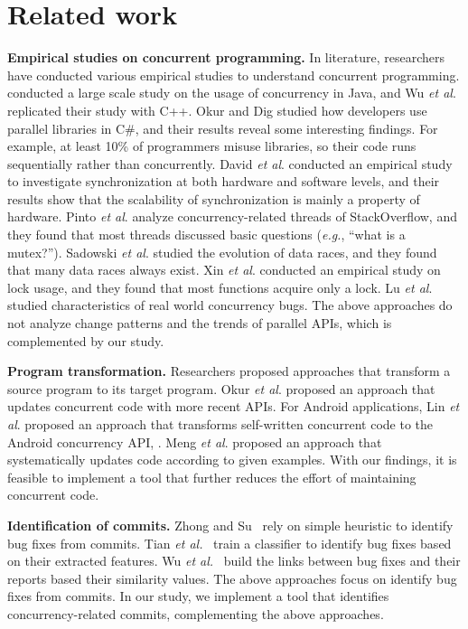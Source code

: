 \section{Related work}
\noindent
\textbf{Empirical studies on concurrent programming.} In literature, researchers have conducted various empirical studies to understand concurrent programming. \cite{journals/jss/PintoTFFB15} conducted a large scale study on the usage of concurrency in Java, and Wu \textit{et al}. \cite{journals/infsof/WuCZX16} replicated their study with C++. Okur and Dig \cite{conf/sigsoft/OkurD12} studied how developers use parallel libraries in C\#, and their results reveal some interesting findings. For example, at least 10\% of programmers misuse libraries, so their code runs sequentially rather than concurrently. David \textit{et al}. \cite{conf/sosp/DavidGT13} conducted an empirical study to investigate synchronization at both hardware and software levels, and their results show that the scalability of synchronization is mainly a property of hardware. Pinto \textit{et al}. \cite{conf/oopsla/PintoTC15} analyze concurrency-related threads of StackOverflow, and they found that most threads discussed basic questions (\emph{e.g.}, ``what is a mutex?''). Sadowski \textit{et al}. \cite{conf/msr/SadowskiYK12} studied the evolution of data races, and they found that many data races always exist. Xin \textit{et al}. \cite{conf/icsm/XinQHXZWG13} conducted an empirical study on lock usage, and they found that most functions acquire only a lock. Lu \textit{et al}. \cite{conf/asplos/LuPSZ08} studied characteristics of real world concurrency bugs. The above approaches do not analyze change patterns and the trends of parallel APIs, which is complemented by our study.

\noindent
\textbf{Program transformation.} Researchers proposed approaches that transform a source program to its target program. Okur \textit{et al}. \cite{conf/ecoop/OkurED14} proposed an approach that updates concurrent code with more recent APIs. For Android applications, Lin \textit{et al}. \cite{conf/sigsoft/LinRD14} proposed an approach that transforms self-written concurrent code to the Android concurrency API, . Meng \textit{et al}. \cite{conf/pldi/MengKM11} proposed an approach that systematically updates code according to given examples. With our findings, it is feasible to implement a tool that further reduces the effort of maintaining concurrent code.

\noindent
\textbf{Identification of commits.} Zhong and Su~\cite{zhong2015bugfix} rely on simple heuristic to identify bug fixes from commits. Tian \emph{et al.}~\cite{tian2012identifying} train a classifier to identify bug fixes based on their extracted features. Wu \emph{et al.}~\cite{wu2011relink} build the links between bug fixes and their reports based their similarity values. The above approaches focus on identify bug fixes from commits. In our study, we implement a tool that identifies concurrency-related commits, complementing the above approaches. 
